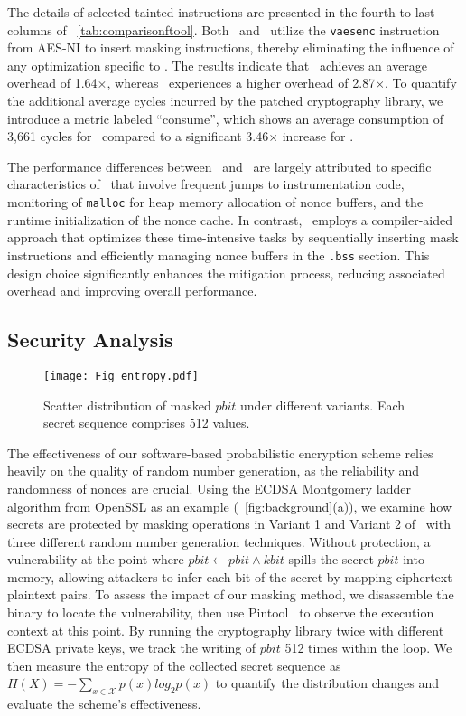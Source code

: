 The details of selected tainted instructions are presented in the fourth-to-last columns of \T~\ref{tab:comparisonftool}. 
Both \tool\ and \ftool\ utilize the \texttt{vaesenc} instruction from AES-NI to insert masking instructions, thereby eliminating the influence of any optimization specific to \tool. 
The results indicate that \tool\ achieves an average overhead of 1.64$\times$, whereas \ftool\ experiences a higher overhead of 2.87$\times$. 
To quantify the additional average cycles incurred by the patched cryptography library, we introduce a metric labeled ``consume'', which shows an average consumption of 3,661 cycles for \tool\ compared to a significant 3.46$\times$ increase for \ftool.

The performance differences between \tool\ and \ftool\ are largely attributed to specific characteristics of \ftool\ that involve frequent jumps to instrumentation code, monitoring of \texttt{malloc} for heap memory allocation of nonce buffers, and the runtime initialization of the nonce cache. 
In contrast, \tool\ employs a compiler-aided approach that optimizes these time-intensive tasks by sequentially inserting mask instructions and efficiently managing nonce buffers in the \texttt{.bss} section. 
This design choice significantly enhances the mitigation process, reducing associated overhead and improving overall performance.

\subsection{Security Analysis}
\label{subsec:security}

\begin{figure}[htbp]
\centering
\texttt{[image: Fig\_entropy.pdf]}
\caption{Scatter distribution of masked $pbit$ under different variants. Each secret sequence comprises 512 values.}
\label{fig:entropy}
\end{figure}

The effectiveness of our software-based probabilistic encryption scheme relies heavily on the quality of random number generation, as the reliability and randomness of nonces are crucial. 
Using the ECDSA Montgomery ladder algorithm from OpenSSL as an example (\F~\ref{fig:background}(a)), we examine how secrets are protected by masking operations in Variant 1 and Variant 2 of \tool\ with three different random number generation techniques.
Without protection, a vulnerability at the point where $pbit \leftarrow pbit \wedge kbit$ spills the secret $pbit$ into memory, allowing attackers to infer each bit of the secret by mapping ciphertext-plaintext pairs.
To assess the impact of our masking method, we disassemble the binary to locate the vulnerability, then use Pintool~\cite{luk2005pin} to observe the execution context at this point.
By running the cryptography library twice with different ECDSA private keys, we track the writing of $pbit$ 512 times within the loop. 
We then measure the entropy of the collected secret sequence as $\mathit{H(X)} = - \sum_{x \in \mathcal{X}} p(x) log_{2} p(x)$ to quantify the distribution changes and evaluate the scheme’s effectiveness.

